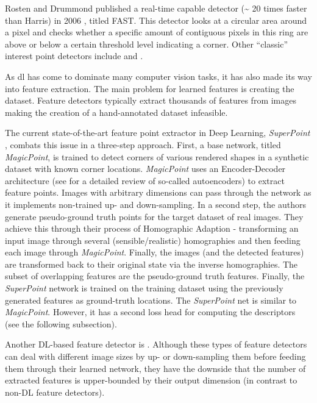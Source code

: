 \documentclass[headsepline, hidelinks, footsepline, footinclude=false, oneside, fontsize=11pt, paper=a4, listof=totoc, bibliography=totoc]{scrbook}
\begin{document}
Rosten and Drummond published a real-time capable detector (\textasciitilde{} 20 times faster than Harris) in 2006 \cite{rostenMachineLearningHighSpeed2006}, titled FAST. This detector looks at a circular area around a pixel
and checks whether a specific amount of contiguous pixels in this ring are above or below a certain threshold level indicating a corner. 
Other ``classic'' interest point detectors include \cite{loweObjectRecognitionLocal1999,loweDistinctiveImageFeatures2004} and \cite{smithSUSANNewApproach1997}.

As \gls{dl} has come to dominate many computer vision tasks, it has also made its way into feature extraction. The main problem for learned features is creating the dataset.
Feature detectors typically extract thousands of features from images making the creation of a hand-annotated dataset infeasible.

The current state-of-the-art feature point extractor in Deep Learning, \emph{SuperPoint} \cite{detoneSuperPointSelfSupervisedInterest2018}, combats this issue in a three-step approach. 
First, a base network, titled \emph{MagicPoint}, is trained to detect corners of various rendered shapes in a synthetic dataset with known corner locations. 
\emph{MagicPoint} uses an Encoder-Decoder architecture (see \cite{bankAutoencoders2020} for a detailed review of so-called autoencoders) to extract feature points. 
Images with arbitrary dimensions can pass through the network as it implements non-trained up- and down-sampling.
In a second step, the authors generate pseudo-ground truth points for the target dataset of real images. They achieve this through their process of Homographic Adaption - transforming an input image through several (sensible/realistic) homographies and then feeding each image through \emph{MagicPoint}. Finally, the images (and the detected features) are transformed back to their original state via the inverse homographies. The subset of overlapping features are the pseudo-ground truth features.
Finally, the \emph{SuperPoint} network is trained on the training dataset using the previously generated features as ground-truth locations. 
The \emph{SuperPoint} net is similar to \emph{MagicPoint}. However, it has a second loss head for computing the descriptors (see the following subsection). 

Another DL-based feature detector is \cite{yiLIFTLearnedInvariant2016}.
Although these types of feature detectors can deal with different image sizes by up- or down-sampling them before feeding them through their learned network, they have the downside that the number of extracted features
is upper-bounded by their output dimension (in contrast to non-DL feature detectors).
\end{document}
